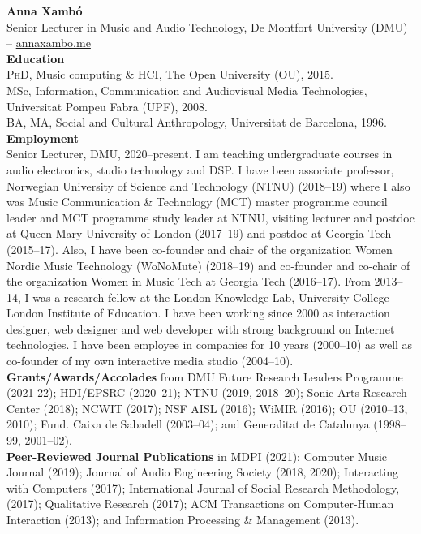 \documentclass[10pt, a4paper]{article}
\begin{document}

{\textbf{Anna Xambó}}\\ 
Senior Lecturer in Music and Audio Technology, De Montfort University (DMU) -- \href{http://annaxambo.me/}{annaxambo.me}\\

{\textbf{Education}}\\
\textsc{PhD}, Music computing \& HCI, The Open University (OU), 2015.\\
MSc, Information, Communication and Audiovisual Media Technologies, Universitat Pompeu Fabra (UPF), 2008.\\
BA, MA, Social and Cultural Anthropology, Universitat de Barcelona, 1996.\\

{\textbf{Employment}}\\
Senior Lecturer, DMU, 2020--present. I am teaching undergraduate courses in audio electronics, studio technology and DSP. 
I have been associate professor, Norwegian University of Science and Technology (NTNU) (2018--19) where I also was Music Communication \& Technology (MCT) master programme council leader and MCT programme study leader at NTNU, visiting lecturer and postdoc at Queen Mary University of London (2017--19) and postdoc at Georgia Tech (2015--17). Also, I have been co-founder and chair of the organization Women Nordic Music Technology (WoNoMute) (2018--19) and co-founder and co-chair of the organization Women in Music Tech at Georgia Tech (2016--17). From 2013--14, I was a research fellow at the London Knowledge Lab, University College London Institute of Education.
I have been working since 2000 as interaction designer, web designer and web developer with strong background on Internet technologies. I have been employee in companies for 10 years (2000--10) as well as co-founder of my own interactive media studio (2004--10).\\

{\textbf{Grants/Awards/Accolades}} from DMU Future Research Leaders Programme (2021-22); HDI/EPSRC (2020--21); NTNU (2019, 2018--20); Sonic Arts Research Center (2018); NCWIT (2017); NSF AISL (2016); WiMIR (2016); OU (2010--13, 2010); Fund. Caixa de Sabadell (2003--04); and Generalitat de Catalunya (1998--99, 2001--02).\\

{\textbf{Peer-Reviewed Journal Publications}} in MDPI (2021); Computer Music Journal (2019); Journal of Audio Engineering Society (2018, 2020); Interacting with Computers (2017); International Journal of Social Research Methodology, (2017); Qualitative Research (2017); ACM Transactions on Computer-Human Interaction (2013); and Information Processing \& Management (2013).\\
\end{document}
